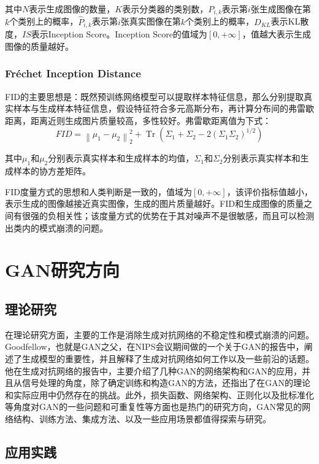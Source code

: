 \documentclass[lang=cn,a4paper,12pt,bibend=biber]{GAN}
\begin{document}
其中$N$表示生成图像的数量，$K$表示分类器的类别数，$P_{i,k}$表示第$i$张生成图像在第$k$个类别上的概率，$\hat{P}_{i,k}$表示第$i$张真实图像在第$k$个类别上的概率，$D_{KL}$表示KL散度，$IS$表示Inception Score。Inception Score的值域为$[0,+\infty]$，值越大表示生成图像的质量越好。
\subsubsection[]{Fréchet Inception Distance}

FID的主要思想是：既然预训练网络模型可以提取样本特征信息，那么分别提取真实样本与生成样本特征信息，假设特征符合多元高斯分布，再计算分布间的弗雷歇距离，距离近则生成图片质量较高，多性较好。弗雷歇距离值为下式：
\begin{equation}
  FID = \left\|\mu_{1}-\mu_{2}\right\|_{2}^{2}+\operatorname{Tr}\left(\Sigma_{1}+\Sigma_{2}-2\left(\Sigma_{1}\Sigma_{2}\right)^{1 / 2}\right)
  \label{eq:frechet_inception_distance}
\end{equation}

其中$\mu_{1}$和$\mu_{2}$分别表示真实样本和生成样本的均值，$\Sigma_{1}$和$\Sigma_{2}$分别表示真实样本和生成样本的协方差矩阵。

FID度量方式的思想和人类判断是一致的，值域为$[0,+\infty]$，该评价指标值越小，表示生成的图像越接近真实图像，生成的图片质量越好。FID和生成图像的质量之间有很强的负相关性；该度量方式的优势在于其对噪声不是很敏感，而且可以检测出类内的模式崩溃的问题。

\section{GAN研究方向}

\subsection{理论研究}

在理论研究方面，主要的工作是消除生成对抗网络的不稳定性和模式崩溃的问题。Goodfellow，也就是GAN之父，在NIPS会议期间做的一个关于GAN的报告中，阐述了生成模型的重要性，并且解释了生成对抗网络如何工作以及一些前沿的话题。他在生成对抗网络的报告中，主要介绍了几种GAN的网络架构和GAN的应用，并且从信号处理的角度，除了确定训练和构造GAN的方法，还指出了在GAN的理论和实际应用中仍然存在的挑战。此外，损失函数、网络架构、正则化以及批标准化等角度对GAN的一些问题和可重复性等方面也是热门的研究方向，GAN常见的网络结构、训练方法、集成方法、以及一些应用场景都值得探索与研究。

\subsection{应用实践}
\end{document}
